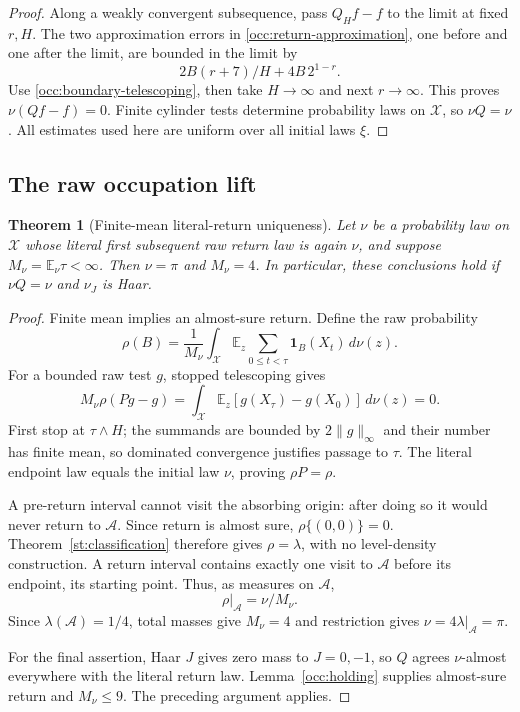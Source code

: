 \documentclass[11pt]{amsart}
\newtheorem{theorem}{Theorem}[section]
\theoremstyle{definition}
\theoremstyle{remark}
\newcommand{\E}{\mathbb E}
\newcommand{\one}{\mathbf 1}
\begin{document}
\begin{proof}
Along a weakly convergent subsequence, pass $Q_Hf-f$ to the limit at
fixed $r,H$.  The two approximation errors in
\eqref{occ:return-approximation}, one before and one after the limit,
are bounded in the limit by
\[
 2B(r+7)/H+4B\,2^{1-r}.
\]
Use \eqref{occ:boundary-telescoping}, then take $H\to\infty$ and next
$r\to\infty$.  This proves $\nu(Qf-f)=0$.  Finite cylinder tests
determine probability laws on $\mathcal X$, so $\nu Q=\nu$.  All estimates used
here are uniform over all initial laws $\xi$.
\end{proof}

\subsection{The raw occupation lift}
\label{occ:lift-subsection}

\begin{theorem}[Finite-mean literal-return uniqueness]\label{occ:epoch-uniqueness}
Let $\nu$ be a probability law on $\mathcal X$ whose literal first
subsequent raw return law is again $\nu$, and suppose
$M_\nu=\E_\nu\tau<\infty$.  Then $\nu=\pi$ and $M_\nu=4$.
In particular, these conclusions hold if $\nu Q=\nu$ and $\nu_J$ is Haar.
\end{theorem}
\begin{proof}
Finite mean implies an almost-sure return.  Define the raw probability
\begin{equation}
 \rho(B)=\frac1{M_\nu}\int_{\mathcal X}\E_z
        \sum_{0\le t<\tau}\one_B(X_t)\,d\nu(z).
 \label{occ:lift}
\end{equation}
For a bounded raw test $g$, stopped telescoping gives
\[
 M_\nu\rho(Pg-g)
   =\int_{\mathcal X}\E_z[g(X_\tau)-g(X_0)]\,d\nu(z)=0.
\]
First stop at $\tau\wedge H$; the summands are bounded by
$2\|g\|_\infty$ and their number has finite mean, so dominated
convergence justifies passage to $\tau$.  The literal endpoint law equals
the initial law $\nu$, proving $\rho P=\rho$.

A pre-return interval cannot visit the absorbing origin: after doing so
it would never return to $\mathcal A$.  Since return is almost sure,
$\rho\{(0,0)\}=0$.  Theorem~\ref{st:classification} therefore gives
$\rho=\lambda$, with no level-density construction.
A return interval contains exactly one visit to $\mathcal A$ before
its endpoint, its starting point.  Thus, as measures on $\mathcal A$,
\[
 \rho|_{\mathcal A}=\nu/M_\nu.
\]
Since $\lambda(\mathcal A)=1/4$, total masses give $M_\nu=4$ and
restriction gives $\nu=4\lambda|_{\mathcal A}=\pi$.

For the final assertion, Haar $J$ gives zero mass to $J=0,-1$, so $Q$
agrees $\nu$-almost everywhere with the literal return law.
Lemma~\ref{occ:holding} supplies almost-sure return and $M_\nu\le9$.
The preceding argument applies.
\end{proof}
\end{document}
